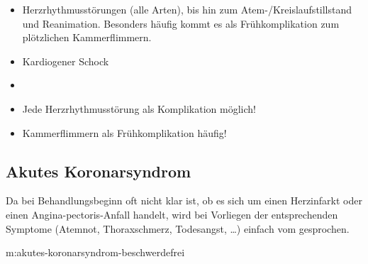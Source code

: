 {%
\begin{itemize}
  \item Herzrhythmusstörungen (alle Arten), bis hin
  zum Atem-/Kreislaufstillstand und Reanimation.
  Besonders häufig kommt es als Frühkomplikation zum
  plötzlichen Kammerflimmern.
  \item Kardiogener Schock 
\end{itemize}
}{
\begin{itemize}
  \item {}
  \item Jede Herzrhythmusstörung als Komplikation möglich!
  \item Kammerflimmern als Frühkomplikation häufig!
\end{itemize}

}{}{}{}



\subsection{Akutes Koronarsyndrom}

Da bei Behandlungsbeginn oft nicht klar ist, ob es sich um
einen Herzinfarkt oder einen Angina-pectoris-Anfall handelt,
wird bei Vorliegen der entsprechenden Symptome (Atemnot,
Thoraxschmerz, Todesangst, \ldots) einfach vom  gesprochen. 


{m:akutes-koronarsyndrom-beschwerdefrei}{}{}



